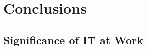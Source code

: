 \documentclass[conference]{IEEEtran}
\begin{document}





\section{Conclusions}





\subsection{Significance of IT at Work}
\end{document}
